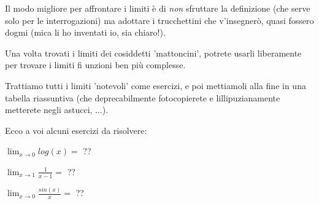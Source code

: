 Il modo migliore per affrontare i limiti è di \emph{non} sfruttare la definizione (che serve solo per le interrogazioni) ma adottare
i trucchettini che v'insegnerò, quasi fossero dogmi (mica li ho inventati io, sia chiaro!).

Una volta trovati i limiti dei cosiddetti 'mattoncini', potrete usarli liberamente per trovare i limiti fi unzioni ben più complesse.

Trattiamo tutti i limiti 'notevoli' come esercizi, e poi mettiamoli alla fine in una tabella riassuntiva (che deprecabilmente
fotocopierete e lillipuzianamente metterete negli astucci, ...).

\begin{esercizio} Ecco a voi alcuni esercizi da risolvere:
    
    $\lim_{x \rightarrow 0} log(x)= $ ??


    $\lim_{x \rightarrow 1} \frac{1}{x-1}= $ ??


    $\lim_{x \rightarrow 0} \frac{sin(x)}{x}= $ ??

\end{esercizio}



